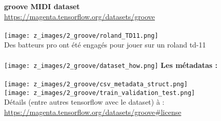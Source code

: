 \textbf{groove MIDI dataset}\\
	\url{https://magenta.tensorflow.org/datasets/groove}\\\\
	\texttt{[image: z\_images/2\_groove/roland\_TD11.png]}\\
	Des batteurs pro ont été engagés pour jouer sur un roland td-11\\\\
	\texttt{[image: z\_images/2\_groove/dataset\_how.png]}\newpage{}
	\textbf{Les métadatas :}\\\\
	\texttt{[image: z\_images/2\_groove/csv\_metadata\_struct.png]}\\
	\texttt{[image: z\_images/2\_groove/train\_validation\_test.png]}\\
	Détails (entre autres tensorflow avec le dataset) à :
	\url{https://magenta.tensorflow.org/datasets/groove#license}\\
	\newpage